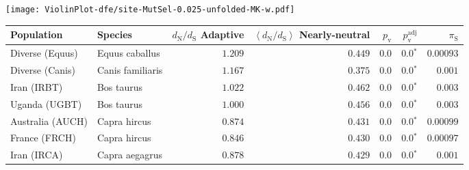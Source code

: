 \begin{center}
\begin{adjustbox}{width = 1\textwidth}
\begin{tabular}{|l|l|r|r|r|r|r|r|r|}
\bottomrule
\end{tabular}
\end{adjustbox}
\newpage
\texttt{[image: ViolinPlot-dfe/site-MutSel-0.025-unfolded-MK-w.pdf]} 
\begin{adjustbox}{width = 1\textwidth}
\begin{tabular}{|l|l|r|r|r|r|r|}
\toprule
                     Population &              Species & \specialcell{$d_{\mathrm{N}} / d_{\mathrm{S}}$ \\ Adaptive} & \specialcell{$\left< d_{\mathrm{N}} / d_{\mathrm{S}} \right>$ \\ Nearly-neutral} & $p_{\mathrm{v}}$ & $p_{\mathrm{v}}^{\mathrm{adj}}$ & $\pi_{\textrm{S}}$ \\
\midrule
                Diverse (Equus) &       Equus caballus &                                           $ 1.209$ &                                           $ 0.449$ &            $0.0$ &                  $\bm{0.0{^*}}$ &          $0.00093$ \\
                Diverse (Canis) &     Canis familiaris &                                           $ 1.167$ &                                           $ 0.375$ &            $0.0$ &                  $\bm{0.0{^*}}$ &           $ 0.001$ \\
                    Iran (IRBT) &           Bos taurus &                                           $ 1.022$ &                                           $ 0.462$ &            $0.0$ &                  $\bm{0.0{^*}}$ &           $ 0.003$ \\
                  Uganda (UGBT) &           Bos taurus &                                           $ 1.000$ &                                           $ 0.456$ &            $0.0$ &                  $\bm{0.0{^*}}$ &           $ 0.003$ \\
               Australia (AUCH) &         Capra hircus &                                           $ 0.874$ &                                           $ 0.431$ &            $0.0$ &                  $\bm{0.0{^*}}$ &          $0.00099$ \\
                  France (FRCH) &         Capra hircus &                                           $ 0.846$ &                                           $ 0.430$ &            $0.0$ &                  $\bm{0.0{^*}}$ &          $0.00097$ \\
                    Iran (IRCA) &       Capra aegagrus &                                           $ 0.878$ &                                           $ 0.429$ &            $0.0$ &                  $\bm{0.0{^*}}$ &           $ 0.001$ \\

\end{tabular}
\end{adjustbox}
\end{center}
